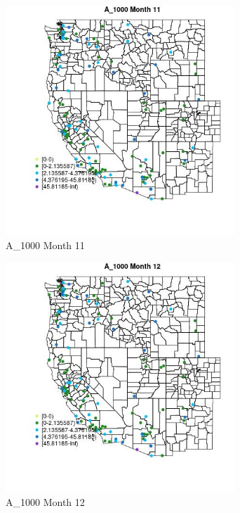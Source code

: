 \begin{figure} 
\centering  
\includegraphics[width=0.77\textwidth]{Code_Outputs/Report_ML_input_PM25_Step4_part_e_de_duplicated_aves_MapObsMo11A_1000.jpg} 
\caption{\label{fig:Report_ML_input_PM25_Step4_part_e_de_duplicated_avesMapObsMo11A_1000}A_1000 Month 11} 
\end{figure} 
 

\begin{figure} 
\centering  
\includegraphics[width=0.77\textwidth]{Code_Outputs/Report_ML_input_PM25_Step4_part_e_de_duplicated_aves_MapObsMo12A_1000.jpg} 
\caption{\label{fig:Report_ML_input_PM25_Step4_part_e_de_duplicated_avesMapObsMo12A_1000}A_1000 Month 12} 
\end{figure} 
 

